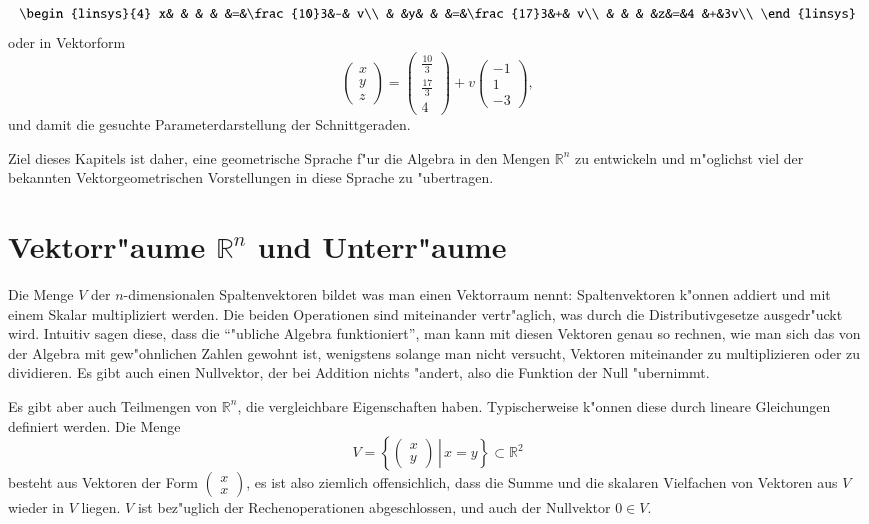 \begin{equation}
\begin{linsys}{4}
x& & & & &=&\frac{10}3&-& v\\
 & &y& & &=&\frac{17}3&+& v\\
 & & & &z&=&4         &+&3v\\
\end{linsys}
\end{equation}
oder in Vektorform
\begin{equation}
\begin{pmatrix}x\\y\\z\end{pmatrix}
=\begin{pmatrix}\frac{10}3\\\frac{17}3\\4\end{pmatrix}
+v\begin{pmatrix}-1\\1\\-3\end{pmatrix},
\end{equation}
und damit die gesuchte Parameterdarstellung der Schnittgeraden.

Ziel dieses Kapitels ist daher, eine geometrische Sprache f"ur die
Algebra in den Mengen $\mathbb R^n$ zu entwickeln und m"oglichst viel
der bekannten Vektorgeometrischen Vorstellungen in diese Sprache
zu "ubertragen.

\section{Vektorr"aume \texorpdfstring{$\mathbb R^n$}{R hoch n} und Unterr"aume}
Die Menge $V$ der $n$-dimensionalen Spaltenvektoren bildet was man
einen Vektorraum nennt: Spaltenvektoren k"onnen addiert und mit
einem Skalar multipliziert werden.
Die beiden Operationen sind
miteinander vertr"aglich, was durch die Distributivgesetze ausgedr"uckt
wird.
Intuitiv sagen diese, dass die ``"ubliche Algebra funktioniert'',
man kann mit diesen Vektoren genau so rechnen, wie man sich das von
der Algebra mit gew"ohnlichen Zahlen gewohnt ist, wenigstens solange
man nicht versucht, Vektoren miteinander zu multiplizieren oder zu
dividieren.
Es gibt auch einen Nullvektor, der bei Addition nichts "andert,
also die Funktion der Null "ubernimmt.

Es gibt aber auch Teilmengen von $\mathbb R^n$, die vergleichbare
Eigenschaften haben.
Typischerweise k"onnen diese durch lineare Gleichungen definiert werden.
Die Menge
\[
V=\left\{\left.\begin{pmatrix}x\\y\end{pmatrix}\,\right|\,x=y\right\}
\subset\mathbb R^2
\]
besteht aus Vektoren der Form $\begin{pmatrix}x\\x\end{pmatrix}$,
es ist also ziemlich offensichlich, dass die Summe und die skalaren
Vielfachen von  Vektoren aus $V$ wieder in $V$ liegen.
$V$ ist
bez"uglich der Rechenoperationen abgeschlossen, und auch der Nullvektor
$0\in V$.

